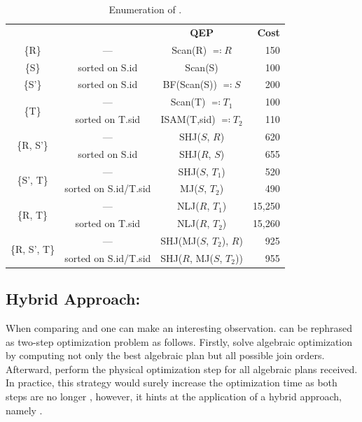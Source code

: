 \begin{table}[t]
    \centering
    \small
    \begin{tabular}{|c!{\vrule width .8pt}c!{\vrule width .8pt}c!{\vrule width .8pt}r|}
       \hline
       \underline{} & \underline{} & \textbf{QEP} & \textbf{Cost} \\
       \{R\} & --- & Scan(R) $\eqcolon R$ & 150 \\
       \hline
       \{S\} & sorted on S.id & Scan(S) & 100 \\
       \hline
       \{S'\} & sorted on S.id & BF(Scan(S)) $\eqcolon S$ & 200 \\
       \hline
        & --- & Scan(T) $\eqcolon T_1$ & 100 \\
       & sorted on T.sid & ISAM(T,sid) $\eqcolon T_2$ & 110 \\
       \hline
        & --- & SHJ($S$, $R$) & 620 \\
       & sorted on S.id & SHJ($R$, $S$) & 655 \\
       \hline
        & --- & SHJ($S$, $T_1$) & 520 \\
       & sorted on S.id/T.sid & MJ($S$, $T_2$) & 490 \\
       \hline
        & --- & NLJ($R$, $T_1$) & 15,250 \\
       & sorted on T.sid & NLJ($R$, $T_2$) & 15,260 \\
       \hline
        & --- & SHJ(MJ($S$, $T_2$), $R$) & 925 \\
       & sorted on S.id/T.sid & SHJ($R$, MJ($S$, $T_2$)) & 955 \\
       \hline
    \end{tabular}
    \caption{Enumeration of \holistic.}
    \label{tbl:example-opt-holistic}
\end{table}

\subsection{Hybrid Approach: \topk}
\label{sec:impl-topk}

When comparing \split and \holistic one can make an interesting observation.  \holistic can be rephrased as two-step optimization problem as follows.  Firstly, solve algebraic optimization by computing not only the best algebraic plan but all possible join orders.  Afterward, perform the physical optimization step for all algebraic plans received.  In practice, this strategy would surely increase the optimization time as both steps are no longer , however, it hints at the application of a hybrid approach, namely \topk.

